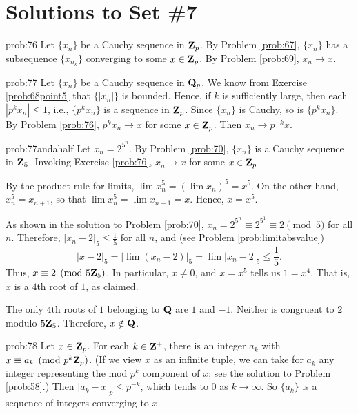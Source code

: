 \chapter*{Solutions to Set \#7}
\label{set6sols}

\begin{sol}{prob:76} Let $\{x_n\}$ be a Cauchy sequence in $\mathbf{Z}_p$. By Problem \ref{prob:67}, $\{x_n\}$ has a  subsequence $\{x_{n_k}\}$ converging to some $x\in \mathbf{Z}_p$. By Problem \ref{prob:69}, $x_n\to x$.
\end{sol}

\begin{sol}{prob:77} Let $\{x_n\}$ be a Cauchy sequence in $\mathbf{Q}_p$. We know from Exercise \ref{prob:68point5} that $\{|x_n|\}$ is bounded. Hence, if $k$ is sufficiently large, then each $|p^k x_n|\le 1$, i.e., $\{p^k x_n\}$ is a sequence in $\mathbf{Z}_p$. Since $\{x_n\}$ is Cauchy, so is $\{p^k x_n\}$. By Problem \ref{prob:76}, $p^k x_n \to x$ for some $x \in \mathbf{Z}_p$. Then $x_n \to p^{-k} x$.
\end{sol}

\begin{sol}{prob:77andahalf} Let $x_n = 2^{5^n}$. By Problem \ref{prob:70}, $\{x_n\}$ is a Cauchy sequence in $\mathbf{Z}_5$. Invoking Exercise \ref{prob:76}, $x_n \to x$ for some $x\in \mathbf{Z}_p$.

By the product rule for limits, $\lim x_n^5 = (\lim x_n)^5= x^5$. On the other hand, $x_n^{5} = x_{n+1}$, so that $\lim x_n^5 = \lim x_{n+1} = x$. Hence, $x=x^5$.

As shown in the solution to Problem \ref{prob:70}, $x_n = 2^{5^n}\equiv 2^{5^1}\equiv 2\pmod{5}$ for all $n$. Therefore, $|x_n-2|_5 \le \frac15$ for all $n$, and (see Problem \ref{prob:limitabsvalue})
\[ |x-2|_5 = |\lim{(x_n-2)}|_5 = \lim |x_n-2|_5 \le \frac{1}{5}. \]
Thus, $x \equiv 2\pmod{5\mathbf{Z}_5}$. In particular, $x\ne 0$, and $x=x^5$ tells us $1=x^4$. That is, $x$ is a $4$th root of $1$, as claimed.

The only $4$th roots of $1$ belonging to $\mathbf{Q}$ are $1$ and $-1$. Neither is congruent to $2$ modulo $5\mathbf{Z}_5$. Therefore, $x\notin \mathbf{Q}$.
\end{sol}

\begin{sol}{prob:78} Let $x \in \mathbf{Z}_p$. For each $k \in \mathbf{Z}^{+}$, there is an integer $a_k$ with $x\equiv a_k\pmod{p^k\mathbf{Z}_p}$. (If we view $x$ as an infinite tuple, we can take for $a_k$ any integer representing the mod $p^k$ component of $x$; see the solution to Problem \ref{prob:58}.) Then $|a_k-x|_{p} \le p^{-k}$, which tends to $0$ as $k\to\infty$. So $\{a_k\}$ is a sequence of integers converging to $x$.
\end{sol}

